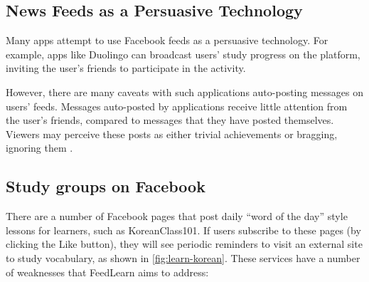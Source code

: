 \documentclass{sigchi}
\begin{document}
\subsection{News Feeds as a Persuasive Technology}

Many apps attempt to use Facebook feeds as a persuasive technology. For example, apps like Duolingo can broadcast users' study progress on the platform, inviting the user's friends to participate in the activity. %

However, there are many caveats with such applications auto-posting messages on users' feeds. Messages auto-posted by applications receive little attention from the user's friends, compared to messages that they have posted themselves. Viewers may perceive these posts as either trivial achievements or bragging, ignoring them \cite{socialsharing}. %

\subsection{Study groups on Facebook}

There are a number of Facebook pages that post daily ``word of the day'' style lessons for learners, such as KoreanClass101. If users subscribe to these pages (by clicking the Like button), they will see periodic reminders to visit an external site to study vocabulary, as shown in \autoref{fig:learn-korean}. These services have a number of weaknesses that FeedLearn aims to address:

\end{document}

